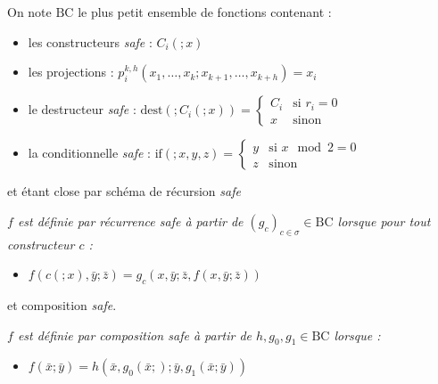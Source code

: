 \documentclass{report}
\begin{document}
		\begin{definition}
			\label{def:BC}
			On note $\text{BC}$ le plus petit ensemble de fonctions contenant :
			
			\begin{itemize}[itemsep=-1mm]
				\item 	les constructeurs \emph{safe} : $C_i\left(; x\right)$
				\item 	les projections : $p_i^{k,h} \left( x_1, \dots, x_{k}; x_{k+1}, \dots, x_{k+h}\right) = x_i$
				\item 	le destructeur \emph{safe} : $\text{dest} \left( ; C_i\left(; x\right) \right) = 
							\left\lbrace \begin{array}{ll}
								C_i	& \text{si $r_i = 0$} \\
								x	& \text{sinon}
							\end{array} \right.$
				\item 	la conditionnelle \emph{safe} : $\text{if}\left( ; x, y, z \right) = 
					\left\lbrace \begin{array}{ll}
						y	& \text{si $x \mod{2} = 0$} \\
						z	& \text{sinon}
					\end{array} \right.$
			\end{itemize}
			
			et étant close par schéma de récursion \emph{safe}
			
			
			
			\emph{$f$ est définie par récurrence \emph{safe} à partir de $\left(g_c\right)_{c \in \sigma} \in \text{BC}$ lorsque pour tout constructeur $c$ :}
			
			\begin{itemize}
				\item 	$f\left(c(;x), \bar{y} ; \bar{z}\right) = g_c\left( x, \bar{y} ; \bar{z}, f(x, \bar{y}; \bar{z}) \right)$
			\end{itemize}

			
			et composition \emph{safe}.
			
			
			
			\emph{$f$ est définie par composition \emph{safe} à partir de $h, g_0, g_1 \in \text{BC}$ lorsque :}
			
			\begin{itemize}
				\item 	$f\left( \bar{x} ; \bar{y}\right) = h\left( \bar{x}, g_0( \bar{x}; ) ; \bar{y}, g_1( \bar{x}; \bar{y} ) \right)$
			\end{itemize}
			
			
		\end{definition}
		
\end{document}
